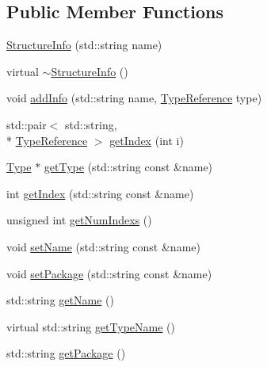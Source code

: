 \subsection*{Public Member Functions}
\begin{DoxyCompactItemize}
\item 
\hyperlink{class_scribble_core_1_1_structure_info_a1c721c66301d3669baa7bdf6f86b4ce8}{Structure\-Info} (std\-::string name)
\item 
virtual \hyperlink{class_scribble_core_1_1_structure_info_a6f3c90da4640ae898b1419b1775d4b93}{$\sim$\-Structure\-Info} ()
\item 
void \hyperlink{class_scribble_core_1_1_structure_info_aabff56fd1c8718de21cdf48fe2a8b6e2}{add\-Info} (std\-::string name, \hyperlink{namespace_scribble_core_a0e685a305b14aa5f0504df1369ba270b}{Type\-Reference} type)
\item 
std\-::pair$<$ std\-::string, \\*
\hyperlink{namespace_scribble_core_a0e685a305b14aa5f0504df1369ba270b}{Type\-Reference} $>$ \hyperlink{class_scribble_core_1_1_structure_info_a3908314d044d793bedc22dbd859f3c18}{get\-Index} (int i)
\item 
\hyperlink{class_scribble_core_1_1_type}{Type} $\ast$ \hyperlink{class_scribble_core_1_1_structure_info_af323b69f12f56ad5efbf6dd6041a9f6f}{get\-Type} (std\-::string const \&name)
\item 
int \hyperlink{class_scribble_core_1_1_structure_info_aaee1675566b39d5edf65cc8884805aaf}{get\-Index} (std\-::string const \&name)
\item 
unsigned int \hyperlink{class_scribble_core_1_1_structure_info_a3ad5e3e1f898a544eead94dfab83dbec}{get\-Num\-Indexs} ()
\item 
void \hyperlink{class_scribble_core_1_1_structure_info_a6c8395d0e3a8a2c26ab15df4439e13e4}{set\-Name} (std\-::string const \&name)
\item 
void \hyperlink{class_scribble_core_1_1_structure_info_a77e7bc5dff5c89c0f765c25280e2b9d7}{set\-Package} (std\-::string const \&name)
\item 
std\-::string \hyperlink{class_scribble_core_1_1_structure_info_a7fef6a1f12ee3d1edfb568c5e8bd36f1}{get\-Name} ()
\item 
virtual std\-::string \hyperlink{class_scribble_core_1_1_structure_info_aaef936b2d4bde471cc701d0096f32710}{get\-Type\-Name} ()
\item 
std\-::string \hyperlink{class_scribble_core_1_1_structure_info_a66e2264485a7efe6293af2df1349d332}{get\-Package} ()
\end{DoxyCompactItemize}


